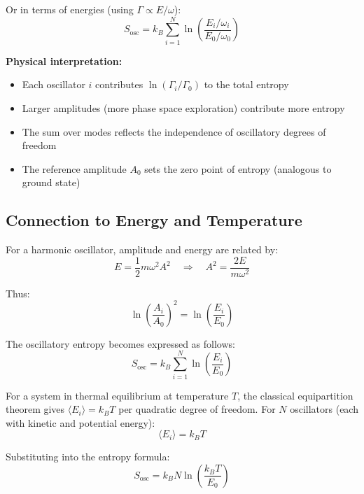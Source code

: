 Or in terms of energies (using $\Gamma \propto E/\omega$):
\begin{equation}
S_{\text{osc}} = k_B \sum_{i=1}^{N} \ln\left(\frac{E_i/\omega_i}{E_0/\omega_0}\right)
\end{equation}

\textbf{Physical interpretation:}
\begin{itemize}
\item Each oscillator $i$ contributes $\ln(\Gamma_i/\Gamma_0)$ to the total entropy
\item Larger amplitudes (more phase space exploration) contribute more entropy
\item The sum over modes reflects the independence of oscillatory degrees of freedom
\item The reference amplitude $A_0$ sets the zero point of entropy (analogous to ground state)
\end{itemize}


\subsection{Connection to Energy and Temperature}

For a harmonic oscillator, amplitude and energy are related by:
\begin{equation}
E = \frac{1}{2}m\omega^2 A^2 \quad \Rightarrow \quad A^2 = \frac{2E}{m\omega^2}
\end{equation}

Thus:
\begin{equation}
\ln\left(\frac{A_i}{A_0}\right)^2 = \ln\left(\frac{E_i}{E_0}\right)
\end{equation}

The oscillatory entropy becomes expressed as follows:
\begin{equation}
S_{\text{osc}} = k_B \sum_{i=1}^{N} \ln\left(\frac{E_i}{E_0}\right)
\end{equation}

For a system in thermal equilibrium at temperature $T$, the classical equipartition theorem gives $\langle E_i \rangle = k_B T$ per quadratic degree of freedom. For $N$ oscillators (each with kinetic and potential energy):
\begin{equation}
\langle E_i \rangle = k_B T
\end{equation}

Substituting into the entropy formula:
\begin{equation}
S_{\text{osc}} = k_B N \ln\left(\frac{k_B T}{E_0}\right)
\end{equation}

